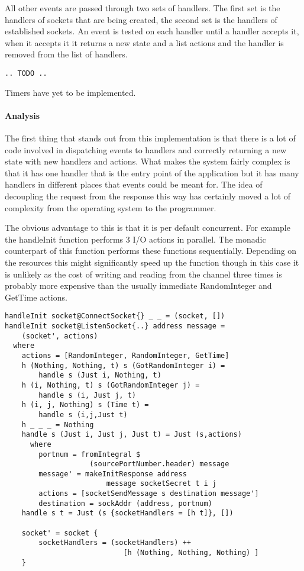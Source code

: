 All other events are passed through two sets of handlers. The first set is the handlers of sockets that are being created, the second set is the handlers of established sockets. An event is tested on each handler until a handler accepts it, when it accepts it it returns a new state and a list actions and the handler is removed from the list of handlers.
\begin{lstlisting}[caption={This code is too ugly, needs to be refactored first}]
.. TODO ..
\end{lstlisting}

Timers have yet to be implemented.

\paragraph{Analysis}
The first thing that stands out from this implementation is that there is a lot of code involved in dispatching events to handlers and correctly returning a new state with new handlers and actions. What makes the system fairly complex is that it has one handler that is the entry point of the application but it has many handlers in different places that events could be meant for. The idea of decoupling the request from the response this way has certainly moved a lot of complexity from the operating system to the programmer.

The obvious advantage to this is that it is per default concurrent. For example the handleInit function performs 3 I/O actions in parallel. The monadic counterpart of this function performs these functions sequentially. Depending on the resources this might significantly speed up the function though in this case it is unlikely as the cost of writing and reading from the channel three times is probably more expensive than the usually immediate RandomInteger and GetTime actions. 

\begin{lstlisting}[caption={The init handler}]
handleInit socket@ConnectSocket{} _ _ = (socket, [])
handleInit socket@ListenSocket{..} address message =
    (socket', actions)
  where
    actions = [RandomInteger, RandomInteger, GetTime]
    h (Nothing, Nothing, t) s (GotRandomInteger i) =
        handle s (Just i, Nothing, t)
    h (i, Nothing, t) s (GotRandomInteger j) =
        handle s (i, Just j, t)
    h (i, j, Nothing) s (Time t) =
        handle s (i,j,Just t)
    h _ _ _ = Nothing
    handle s (Just i, Just j, Just t) = Just (s,actions)
      where
        portnum = fromIntegral $
                    (sourcePortNumber.header) message
        message' = makeInitResponse address
                        message socketSecret t i j
        actions = [socketSendMessage s destination message']
        destination = sockAddr (address, portnum)
    handle s t = Just (s {socketHandlers = [h t]}, [])

    socket' = socket { 
        socketHandlers = (socketHandlers) ++
                            [h (Nothing, Nothing, Nothing) ]
    }
\end{lstlisting}

